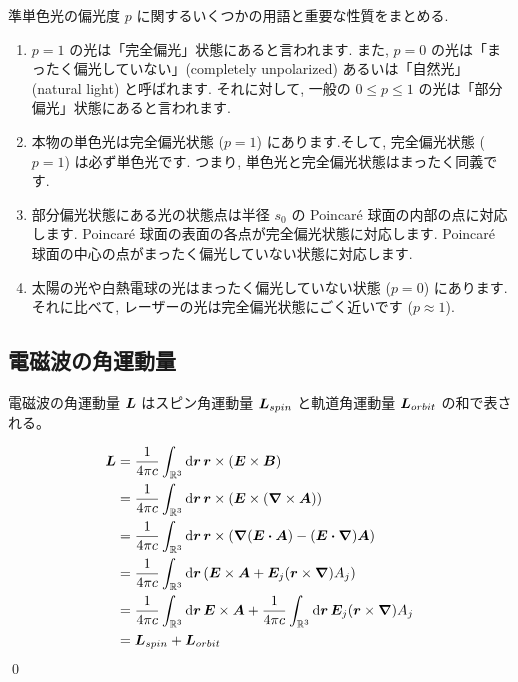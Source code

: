 \documentclass[uplatex,dvipdfmx,a4paper,11pt]{jlreq}
\makeatletter
\newcommand{\RR}{\mathbb{R}}
\newcommand{\EE}{\bm{E}}
\newcommand{\BB}{\bm{B}}
\renewcommand{\AA}{\bm{A}}
\newcommand{\rr}{\bm{r}}
\theoremstyle{definition}
\renewenvironment{proof}[1][\proofname]{\par
  \normalfont
  \topsep6\p@\@plus6\p@ \trivlist
  \item[\hskip\labelsep{\bfseries #1}\@addpunct{\bfseries}]\ignorespaces\quad\par
}{%
  \qed\endtrivlist\@endpefalse
}
\renewcommand\proofname{証明}
\makeatother
\begin{document}
準単色光の偏光度 $p$ に関するいくつかの用語と重要な性質をまとめる.
\begin{enumerate}
  \item $p = 1$ の光は「完全偏光」状態にあると言われます. また, $p = 0$ の光は「まったく偏光していない」(completely unpolarized) あるいは「自然光」(natural light) と呼ばれます. それに対して, 一般の $0 \leq p \leq 1$ の光は「部分偏光」状態にあると言われます.
  \item 本物の単色光は完全偏光状態 ($p = 1$) にあります.そして, 完全偏光状態 ($p = 1$) は必ず単色光です. つまり, 単色光と完全偏光状態はまったく同義です.
  \item 部分偏光状態にある光の状態点は半径 $s_0$ の Poincaré 球面の内部の点に対応します. Poincaré 球面の表面の各点が完全偏光状態に対応します. Poincaré 球面の中心の点がまったく偏光していない状態に対応します.
  \item 太陽の光や白熱電球の光はまったく偏光していない状態 ($p = 0$) にあります. それに比べて, レーザーの光は完全偏光状態にごく近いです ($p \approx 1$).
\end{enumerate}

\subsection{電磁波の角運動量}
\begin{theorem}
  電磁波の角運動量 $\bm{L}$ はスピン角運動量 $\bm{L}_{spin}$ と軌道角運動量 $\bm{L}_{orbit}$ の和で表される。
\end{theorem}
\begin{proof}
  \begin{align}
    \LL & = \frac{1}{4\pi c}\int_{\RR^3}\dd{\rr}\rr\times(\EE\times\BB)                                                       \\
        & = \frac{1}{4\pi c}\int_{\RR^3}\dd{\rr}\rr\times(\EE\times(\vnabla\times\AA))                                        \\
        & = \frac{1}{4\pi c}\int_{\RR^3}\dd{\rr}\rr\times(\vnabla(\EE\vdot\AA) - (\EE\vdot\vnabla)\AA)                        \\
        & = \frac{1}{4\pi c}\int_{\RR^3}\dd{\rr}\qty(\EE\times\AA + \EE_j(\rr\times\vnabla)A_j)                               \\
        & = \frac{1}{4\pi c}\int_{\RR^3}\dd{\rr}\EE\times\AA + \frac{1}{4\pi c}\int_{\RR^3}\dd{\rr}\EE_j(\rr\times\vnabla)A_j \\
        & = \LL_{spin} + \LL_{orbit}
  \end{align}
\end{proof}
\end{document}
